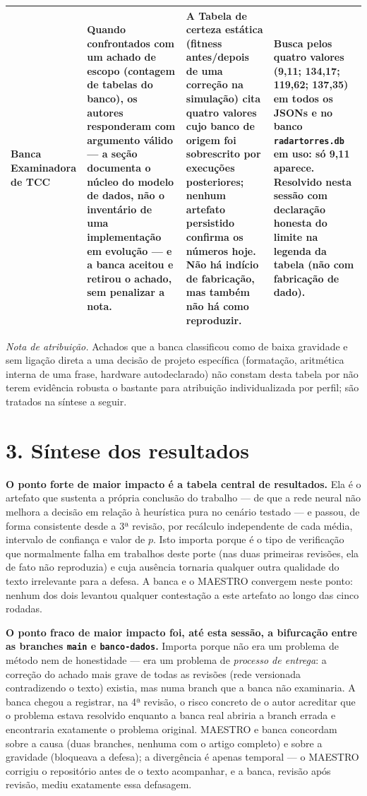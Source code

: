 \documentclass[11pt,a4paper]{article}
\begin{document}
\begin{longtable}{|p{2.1cm}|p{3.5cm}|p{3.5cm}|p{5.9cm}|}
Banca Examinadora de TCC &
Quando confrontados com um achado de escopo (contagem de tabelas do banco), os autores responderam
com argumento válido --- a seção documenta o núcleo do modelo de dados, não o inventário de uma
implementação em evolução --- e a banca aceitou e retirou o achado, sem penalizar a nota. &
A Tabela de certeza estática (fitness antes/depois de uma correção na simulação) cita quatro valores
cujo banco de origem foi sobrescrito por execuções posteriores; nenhum artefato persistido confirma
os números hoje. Não há indício de fabricação, mas também não há como reproduzir. &
Busca pelos quatro valores (9,11; 134,17; 119,62; 137,35) em todos os JSONs e no banco
\texttt{radartorres.db} em uso: só 9,11 aparece. Resolvido nesta sessão com declaração honesta do
limite na legenda da tabela (não com fabricação de dado). \\
\hline
\end{longtable}

\textit{Nota de atribuição.} Achados que a banca classificou como de baixa gravidade e sem ligação
direta a uma decisão de projeto específica (formatação, aritmética interna de uma frase, hardware
autodeclarado) não constam desta tabela por não terem evidência robusta o bastante para atribuição
individualizada por perfil; são tratados na síntese a seguir.

\section*{3. Síntese dos resultados}

\textbf{O ponto forte de maior impacto é a tabela central de resultados.} Ela é o artefato que
sustenta a própria conclusão do trabalho --- de que a rede neural não melhora a decisão em relação à
heurística pura no cenário testado --- e passou, de forma consistente desde a 3ª revisão, por
recálculo independente de cada média, intervalo de confiança e valor de $p$. Isto importa porque é
o tipo de verificação que normalmente falha em trabalhos deste porte (nas duas primeiras revisões,
ela de fato não reproduzia) e cuja ausência tornaria qualquer outra qualidade do texto irrelevante
para a defesa. A banca e o MAESTRO convergem neste ponto: nenhum dos dois levantou qualquer
contestação a este artefato ao longo das cinco rodadas.

\textbf{O ponto fraco de maior impacto foi, até esta sessão, a bifurcação entre as branches
\texttt{main} e \texttt{banco-dados}.} Importa porque não era um problema de método nem de
honestidade --- era um problema de \textit{processo de entrega}: a correção do achado mais grave de
todas as revisões (rede versionada contradizendo o texto) existia, mas numa branch que a banca não
examinaria. A banca chegou a registrar, na 4ª revisão, o risco concreto de o autor acreditar que o
problema estava resolvido enquanto a banca real abriria a branch errada e encontraria exatamente o
problema original. MAESTRO e banca concordam sobre a causa (duas branches, nenhuma com o artigo
completo) e sobre a gravidade (bloqueava a defesa); a divergência é apenas temporal --- o MAESTRO
corrigiu o repositório antes de o texto acompanhar, e a banca, revisão após revisão, mediu exatamente
essa defasagem.
\end{document}
